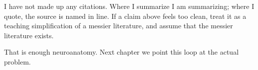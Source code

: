 I have not made up any citations. Where I summarize I am summarizing; where I quote, the source is named in line. If a claim above feels too clean, treat it as a teaching simplification of a messier literature, and assume that the messier literature exists.

That is enough neuroanatomy. Next chapter we point this loop at the actual problem.
